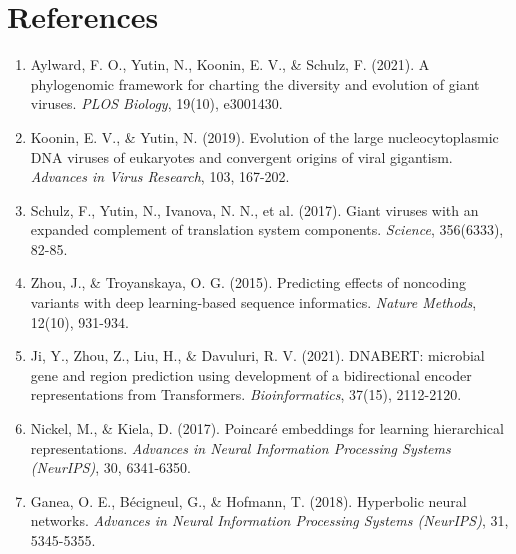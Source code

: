 \documentclass[11pt,a4paper]{article}
\begin{document}
\section*{References}
\begin{enumerate}
    \item Aylward, F. O., Yutin, N., Koonin, E. V., \& Schulz, F. (2021). A phylogenomic framework for charting the diversity and evolution of giant viruses. \textit{PLOS Biology}, 19(10), e3001430.
    
    \item Koonin, E. V., \& Yutin, N. (2019). Evolution of the large nucleocytoplasmic DNA viruses of eukaryotes and convergent origins of viral gigantism. \textit{Advances in Virus Research}, 103, 167-202.
    
    \item Schulz, F., Yutin, N., Ivanova, N. N., et al. (2017). Giant viruses with an expanded complement of translation system components. \textit{Science}, 356(6333), 82-85.
    
    \item Zhou, J., \& Troyanskaya, O. G. (2015). Predicting effects of noncoding variants with deep learning-based sequence informatics. \textit{Nature Methods}, 12(10), 931-934.
    
    \item Ji, Y., Zhou, Z., Liu, H., \& Davuluri, R. V. (2021). DNABERT: microbial gene and region prediction using development of a bidirectional encoder representations from Transformers. \textit{Bioinformatics}, 37(15), 2112-2120.
    
    \item Nickel, M., \& Kiela, D. (2017). Poincaré embeddings for learning hierarchical representations. \textit{Advances in Neural Information Processing Systems (NeurIPS)}, 30, 6341-6350.
    
    \item Ganea, O. E., Bécigneul, G., \& Hofmann, T. (2018). Hyperbolic neural networks. \textit{Advances in Neural Information Processing Systems (NeurIPS)}, 31, 5345-5355.
\end{enumerate}
\end{document}
